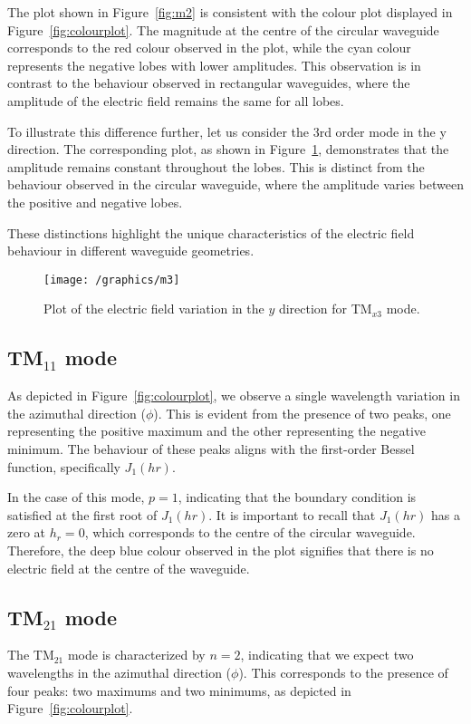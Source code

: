 The plot shown in Figure~\ref{fig:m2} is consistent with the colour plot displayed in Figure~\ref{fig:colourplot}. The magnitude at the centre of the circular waveguide corresponds to the red colour observed in the plot, while the cyan colour represents the negative lobes with lower amplitudes. This observation is in contrast to the behaviour observed in rectangular waveguides, where the amplitude of the electric field remains the same for all lobes.

To illustrate this difference further, let us consider the 3rd order mode in the y direction. The corresponding plot, as shown in Figure~\ref{fig:m3}, demonstrates that the amplitude remains constant throughout the lobes. This is distinct from the behaviour observed in the circular waveguide, where the amplitude varies between the positive and negative lobes.

These distinctions highlight the unique characteristics of the electric field behaviour in different waveguide geometries.
\begin{figure}[h]
\centering
\texttt{[image: /graphics/m3]}
\caption{Plot of the electric field variation in the $y$ direction for TM$_{x3}$ mode.}
\label{fig:m3}
\end{figure}

\subsection{TM$_{11}$ mode}
As depicted in Figure~\ref{fig:colourplot}, we observe a single wavelength variation in the azimuthal direction ($\phi$). This is evident from the presence of two peaks, one representing the positive maximum and the other representing the negative minimum. The behaviour of these peaks aligns with the first-order Bessel function, specifically $J_1(hr)$.

In the case of this mode, $p=1$, indicating that the boundary condition is satisfied at the first root of $J_1(hr)$. It is important to recall that $J_1(hr)$ has a zero at $h_r=0$, which corresponds to the centre of the circular waveguide. Therefore, the deep blue colour observed in the plot signifies that there is no electric field at the centre of the waveguide.

\subsection{TM$_{21}$ mode}
The TM$_{21}$ mode is characterized by $n=2$, indicating that we expect two wavelengths in the azimuthal direction ($\phi$). This corresponds to the presence of four peaks: two maximums and two minimums, as depicted in Figure~\ref{fig:colourplot}.


